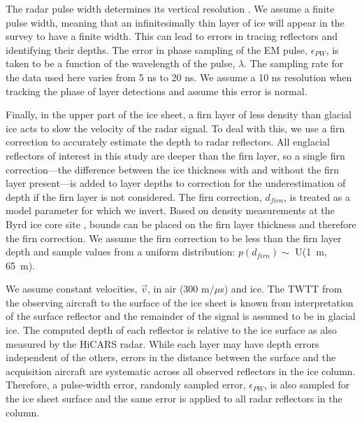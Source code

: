 The radar pulse width determines its vertical resolution \citep{millar1982}. We assume a finite pulse width, meaning that an infinitesimally thin layer of ice will appear in the survey to have a finite width. This can lead to errors in tracing reflectors and identifying their depths. The error in phase sampling of the EM pulse, $\epsilon_{PW}$, is taken to be a function of the wavelength of the pulse, $\lambda$. The sampling rate for the data used here varies from 5 ns to 20 ns. We assume a 10 ns resolution when tracking the phase of layer detections and assume this error is normal.

Finally, in the upper part of the ice sheet, a firn layer of less density than glacial ice acts to slow the velocity of the radar signal. To deal with this, we use a firn correction to accurately estimate the depth to radar reflectors. All englacial reflectors of interest in this study are deeper than the firn layer, so a single firn correction---the difference between the ice thickness with and without the firn layer present---is added to layer depths to correction for the underestimation of depth if the firn layer is not considered. The firn correction, $d_{firn}$, is treated as a model parameter for which we invert. Based on density measurements at the Byrd ice core site \citep{gow1970}, bounds can be placed on the firn layer thickness and therefore the firn correction. We assume the firn correction to be less than the firn layer depth and sample values from a uniform distribution: $p(d_{firn})\sim$ U(1~m, 65~m). %


We assume constant velocities, $\vec{v}$, in air (300 m/${\mu}$s) and ice. The TWTT from the observing aircraft to the surface of the ice sheet is known from interpretation of the surface reflector and the remainder of the signal is assumed to be in glacial ice. The computed depth of each reflector is relative to the ice surface as also measured by the HiCARS radar. While each layer may have depth errors independent of the others, errors in the distance between the surface and the acquisition aircraft are systematic across all observed reflectors in the ice column. Therefore, a pulse-width error, randomly sampled error, $\epsilon_{PW}$, is also sampled for the ice sheet surface and the same error is applied to all radar reflectors in the column. 








